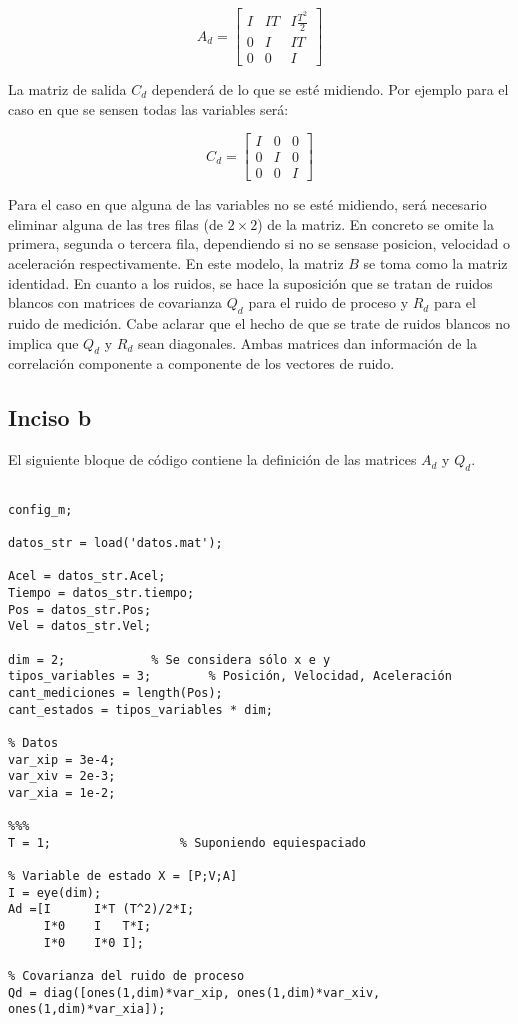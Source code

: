 		\begin{equation*}
			A_{d} = \begin{bmatrix} I & IT & I\frac{T^2}{2} \\[0.3em] 0 & I & IT \\[0.3em] 0 & 0 & I \end{bmatrix}
		\end{equation*}

	La matriz de salida $C_{d}$ dependerá de lo que se esté midiendo. Por ejemplo para el caso en que se sensen todas las variables será:
	
		\begin{equation*}
			C_{d} = \begin{bmatrix} I & 0 & 0 \\[0.3em] 0 & I & 0 \\[0.3em] 0 & 0 & I \end{bmatrix}
		\end{equation*}
		
		Para el caso en que alguna de las variables no se esté midiendo, será necesario eliminar alguna de las tres filas (de $2\times2$) de la matriz. En concreto se omite la primera, segunda o tercera fila, dependiendo si no se sensase posicion, velocidad o aceleración respectivamente. 
		En este modelo, la matriz $B$ se toma como la matriz identidad.
	En cuanto a los ruidos, se hace la suposición que se tratan de ruidos blancos con matrices de covarianza $Q_{d}$ para el ruido de proceso y $R_{d}$ para el ruido de medición. Cabe aclarar que el hecho de que se trate de ruidos blancos no implica que $Q_{d}$ y $R_{d}$ sean diagonales. Ambas matrices dan información de la correlación componente a componente de los vectores de ruido.
	
\subsection{Inciso b}

	El siguiente bloque de código contiene la definición de las matrices $A_{d}$ y $Q_{d}$.

	\begin{lstlisting}
	
config_m;			

datos_str = load('datos.mat');

Acel = datos_str.Acel;
Tiempo = datos_str.tiempo;
Pos = datos_str.Pos;
Vel = datos_str.Vel;

dim = 2;			% Se considera sólo x e y
tipos_variables = 3;		% Posición, Velocidad, Aceleración
cant_mediciones = length(Pos);
cant_estados = tipos_variables * dim;

% Datos
var_xip = 3e-4;
var_xiv = 2e-3;
var_xia = 1e-2;

%%%
T = 1;					% Suponiendo equiespaciado

% Variable de estado X = [P;V;A]
I = eye(dim);
Ad =[I		I*T	(T^2)/2*I;
     I*0	I	T*I;
     I*0	I*0	I];

% Covarianza del ruido de proceso
Qd = diag([ones(1,dim)*var_xip, ones(1,dim)*var_xiv, ones(1,dim)*var_xia]);

	\end{lstlisting}
	
